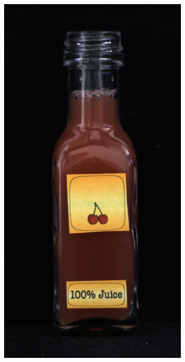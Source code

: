 \begin{figure}[H]
    \begin{subfigure}[b]{\textwidth}
        \centering
        \begin{minipage}{0.45\textwidth}
            \centering
            \includegraphics[width=\textwidth]{figures/appendix/appendix_DRAEM/JB/139.png}

\end{minipage}
\end{subfigure}
\end{figure}
